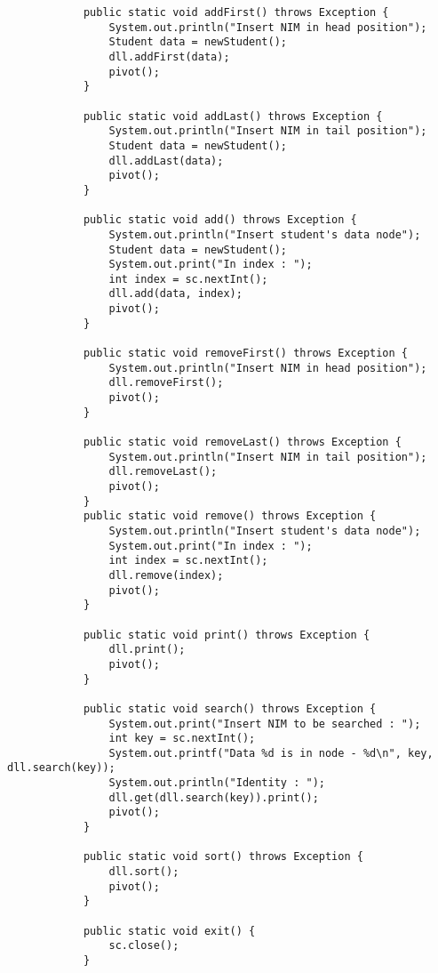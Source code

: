 \documentclass[12pt,titlepage]{article}
\begin{document}
\begin{enumerate}
\begin{verbatim}
            public static void addFirst() throws Exception {
                System.out.println("Insert NIM in head position");
                Student data = newStudent();
                dll.addFirst(data);
                pivot();
            }

            public static void addLast() throws Exception {
                System.out.println("Insert NIM in tail position");
                Student data = newStudent();
                dll.addLast(data);
                pivot();
            }

            public static void add() throws Exception {
                System.out.println("Insert student's data node");
                Student data = newStudent();
                System.out.print("In index : ");
                int index = sc.nextInt();
                dll.add(data, index);
                pivot();
            }

            public static void removeFirst() throws Exception {
                System.out.println("Insert NIM in head position");
                dll.removeFirst();
                pivot();
            }

            public static void removeLast() throws Exception {
                System.out.println("Insert NIM in tail position");
                dll.removeLast();
                pivot();
            }
            public static void remove() throws Exception {
                System.out.println("Insert student's data node");
                System.out.print("In index : ");
                int index = sc.nextInt();
                dll.remove(index);
                pivot();
            }

            public static void print() throws Exception {
                dll.print();
                pivot();
            }

            public static void search() throws Exception {
                System.out.print("Insert NIM to be searched : ");
                int key = sc.nextInt();
                System.out.printf("Data %d is in node - %d\n", key, dll.search(key));
                System.out.println("Identity : ");
                dll.get(dll.search(key)).print();
                pivot();
            }

            public static void sort() throws Exception {
                dll.sort();
                pivot();
            }

            public static void exit() {
                sc.close();
            }


\end{verbatim}
\end{enumerate}
\end{document}
